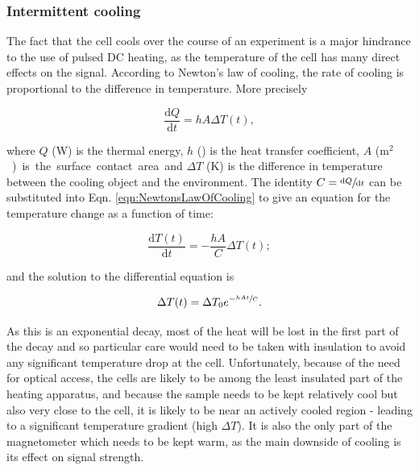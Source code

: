 \documentclass[PaulGanssle-Thesis.tex]{subfiles}
\begin{document}
\subsubsection{Intermittent cooling}
\label{mag.design.cooling}
The fact that the cell cools over the course of an experiment is a major hindrance to the use of pulsed DC heating, as the temperature of the cell has many direct effects on the signal. According to Newton's law of cooling, the rate of cooling is proportional to the difference in temperature. More precisely\citep{Burmeister1993}

\begin{equation}
\label{eqn:NewtonsLawOfCooling}
\frac{\mathrm{d}Q}{\mathrm{d}t} = hA\Delta T(t),
\end{equation}

where $Q$ (\unit{W}) is the thermal energy, $h$ () is the heat transfer coefficient, $A$ (\unit{m$^2$}) is the surface contact area and $\Delta T$ (\unit{K}) is the difference in temperature between the cooling object and the environment. The identity $C = \sfrac{\mathrm{d}Q}{\mathrm{d}t}$ can be substituted into Eqn. \ref{eqn:NewtonsLawOfCooling} to give an equation for the temperature change as a function of time:

\begin{equation}
\label{eqn:TemperatureDifferentialEquation}
\frac{\mathrm{d}T(t)}{\mathrm{d}t} = -\frac{hA}{C}\Delta T(t);
\end{equation}

and the solution to the differential equation is

\begin{equation}
\Delta T(t) = \Delta T_{0}e^{-\sfrac{hAt}{C}}.
\label{eqn:TemperatureLossEquation}
\end{equation}

As this is an exponential decay, most of the heat will be lost in the first part of the decay and so particular care would need to be taken with insulation to avoid any significant temperature drop at the cell. Unfortunately, because of the need for optical access, the cells are likely to be among the least insulated part of the heating apparatus, and because the sample needs to be kept relatively cool but also very close to the cell, it is likely to be near an actively cooled region - leading to a significant temperature gradient (high $\Delta T$). It is also the only part of the magnetometer which needs to be kept warm, as the main downside of cooling is its effect on signal strength.
\end{document}
